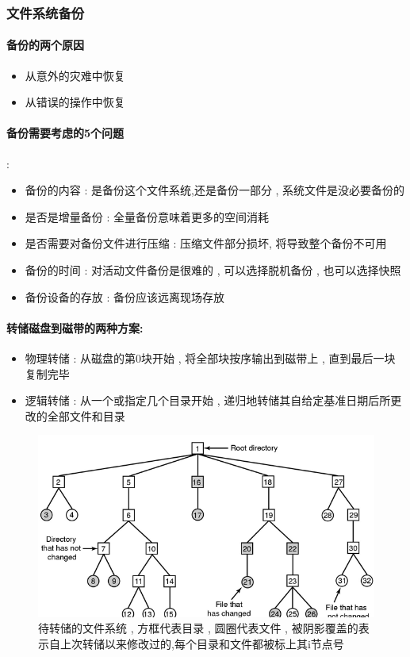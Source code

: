\documentclass[UTF8,a4paper]{ctexart}
\begin{document}
\subsubsection{文件系统备份}
\paragraph{备份的两个原因}
\begin{itemize}
	\item 从意外的灾难中恢复
	\item 从错误的操作中恢复
\end{itemize}

\paragraph{备份需要考虑的5个问题}:
\begin{itemize}
	\item 备份的内容 : 是备份这个文件系统,还是备份一部分 , 系统文件是没必要备份的
	\item 是否是增量备份 : 全量备份意味着更多的空间消耗
	\item 是否需要对备份文件进行压缩 : 压缩文件部分损坏, 将导致整个备份不可用
	\item 备份的时间 : 对活动文件备份是很难的 , 可以选择脱机备份 , 也可以选择快照
	\item 备份设备的存放 : 备份应该远离现场存放
\end{itemize}


\paragraph{转储磁盘到磁带的两种方案:}
\begin{itemize}
	\item 物理转储 : 从磁盘的第0块开始 , 将全部块按序输出到磁带上 , 直到最后一块复制完毕
	\item 逻辑转储 : 从一个或指定几个目录开始 , 递归地转储其自给定基准日期后所更改的全部文件和目录
\end{itemize}

\begin{figure}[H]
	\centering
	\includegraphics[scale = 0.6]{assets/ModernOperatingSystems/2018-01-08-19-18-20.png}
	\caption{待转储的文件系统 , 方框代表目录 , 圆圈代表文件 , 被阴影覆盖的表示自上次转储以来修改过的,每个目录和文件都被标上其i节点号}
\end{figure}
\end{document}
